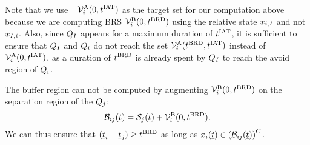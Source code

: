 Note that we use $-\mathcal{V}^{\text{A}}_{i}(0, t^\text{IAT})$ as the target set for our computation above because we are computing BRS $\mathcal{V}^{\text{B}}_{i}(0, t^\text{BRD})$ using the relative state $x_{i, I}$ and not $x_{I, i}$. Also, since $Q_{I}$ appears for a maximum duration of $t^\text{IAT}$, it is sufficient to ensure that $Q_{I}$ and $Q_i$ do not reach the set $\mathcal{V}^{\text{A}}_{i}(t^\text{BRD}, t^\text{IAT})$ instead of $\mathcal{V}^{\text{A}}_{i}(0, t^\text{IAT})$, as a duration of $t^\text{BRD}$ is already spent by $Q_{I}$ to reach the avoid region of $Q_i$.

The buffer region can not be computed by augmenting $\mathcal{V}^{\text{B}}_{i}(0, t^\text{BRD})$ on the separation region of the $Q_j$:
\begin{equation} \label{eqn:buffRegion_case1}
\buff_{ij}(\tsa) = \sep_j(\tsa) + \brs^{\text{B}}_{i}(0, \brd).
\end{equation} 
We can thus ensure that $(\underline{t}_i - \underline{t}_j) \geq t^\text{BRD}$ as long as $x_i(\underline{t}) \in \left(\mathcal{B}_{ij}(\underline{t})\right)^C$.

